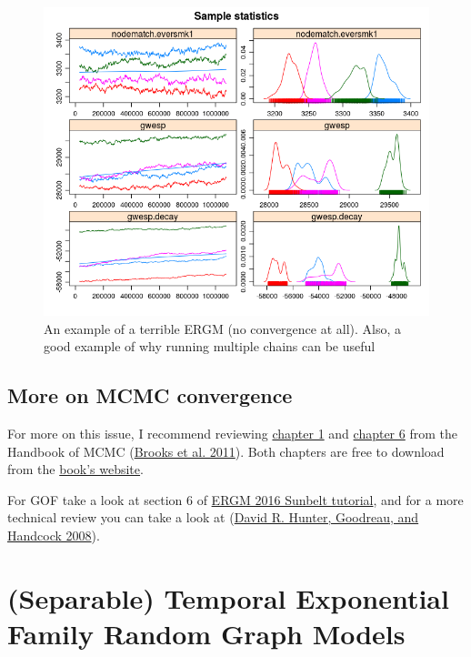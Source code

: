 \documentclass[
]{book}
\begin{document}
\begin{figure}[!h]
\includegraphics[width=9.92in]{awful-chains} \caption{An example of a terrible ERGM (no convergence at all). Also, a good example of why running multiple chains can be useful}\label{fig:badconvergence}
\end{figure}

\hypertarget{more-on-mcmc-convergence}{%
\section{More on MCMC convergence}\label{more-on-mcmc-convergence}}

For more on this issue, I recommend reviewing \href{http://www.mcmchandbook.net/HandbookChapter1.pdf}{chapter 1} and \href{http://www.mcmchandbook.net/HandbookChapter6.pdf}{chapter 6} from the Handbook of MCMC (\protect\hyperlink{ref-brooks2011}{Brooks et al. 2011}). Both chapters are free to download from the \href{http://www.mcmchandbook.net/HandbookSampleChapters.html}{book's website}.

For GOF take a look at section 6 of \href{https://statnet.csde.washington.edu/trac/raw-attachment/wiki/Sunbelt2016/ergm_tutorial.html}{ERGM 2016 Sunbelt tutorial}, and for a more technical review you can take a look at (\protect\hyperlink{ref-HunterJASA2008}{David R. Hunter, Goodreau, and Handcock 2008}).

\hypertarget{separable-temporal-exponential-family-random-graph-models}{%
\chapter{(Separable) Temporal Exponential Family Random Graph Models}\label{separable-temporal-exponential-family-random-graph-models}}
\end{document}

